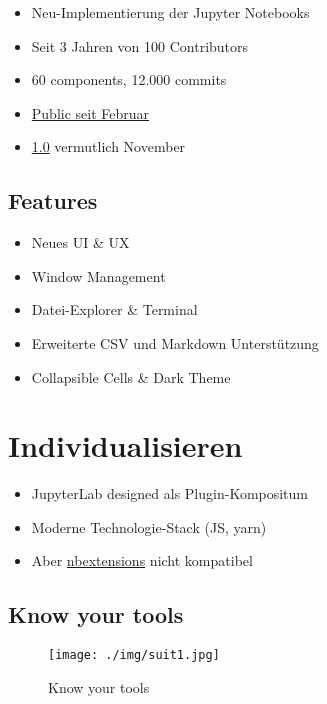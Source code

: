 \documentclass[11pt]{article}
\makeatletter
\def\maxwidth{\ifdim\Gin@nat@width>\linewidth\linewidth
    \else\Gin@nat@width\fi}
\let\Oldincludegraphics\includegraphics
\renewcommand{\includegraphics}[1]{\Oldincludegraphics[width=.8\maxwidth]{#1}}
\providecommand{\tightlist}{%
      \setlength{\itemsep}{0pt}\setlength{\parskip}{0pt}}
\makeatother
\begin{document}
\begin{itemize}
\tightlist
\item
  Neu-Implementierung der Jupyter Notebooks
\item
  Seit 3 Jahren von 100 Contributors
\item
  60 components, 12.000 commits
\item
  \href{https://blog.jupyter.org/jupyterlab-is-ready-for-users-5a6f039b8906}{Public
  seit Februar}
\item
  \href{https://github.com/jupyterlab/jupyterlab/milestone/2}{1.0}
  vermutlich November
\end{itemize}

    \hypertarget{features}{%
\subsection{Features}\label{features}}

\begin{itemize}
\tightlist
\item
  Neues UI \& UX
\item
  Window Management
\item
  Datei-Explorer \& Terminal
\item
  Erweiterte CSV und Markdown Unterstützung
\item
  Collapsible Cells \& Dark Theme
\end{itemize}

    \hypertarget{individualisieren}{%
\section{Individualisieren}\label{individualisieren}}

    \begin{itemize}
\tightlist
\item
  JupyterLab designed als Plugin-Kompositum
\item
  Moderne Technologie-Stack (JS, yarn)
\item
  Aber
  \href{https://github.com/ipython-contrib/jupyter_contrib_nbextensions}{nbextensions}
  nicht kompatibel
\end{itemize}

    \hypertarget{know-your-tools}{%
\subsection{Know your tools}\label{know-your-tools}}

\begin{figure}
\centering
\texttt{[image: ./img/suit1.jpg]}
\caption{Know your tools}
\end{figure}
\end{document}
